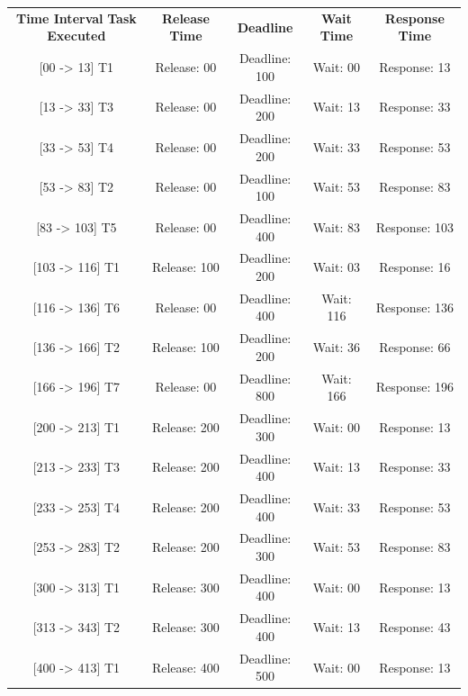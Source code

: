 \documentclass{report}
\begin{document}
\begin{table}[H]
    \centering
    \begin{tabular}{| c | c | c | c | c |}
        \hline
         \textbf{Time Interval} \textbf{Task Executed} & \textbf{Release Time} & \textbf{Deadline} & \textbf{Wait Time} & \textbf{Response Time} \\
        {[00 -> 13]} T1 & Release: 00 & Deadline: 100 & Wait: 00 & Response: 13 \\
        \hline
        {[13 -> 33]} T3 & Release: 00 & Deadline: 200 & Wait: 13 & Response: 33 \\
        \hline
        {[33 -> 53]} T4 & Release: 00 & Deadline: 200 & Wait: 33 & Response: 53 \\
        \hline
        {[53 -> 83]} T2 & Release: 00 & Deadline: 100 & Wait: 53 & Response: 83 \\
        \hline
        {[83 -> 103]} T5 & Release: 00 & Deadline: 400 & Wait: 83 & Response: 103 \\
        \hline
        {[103 -> 116]} T1 & Release: 100 & Deadline: 200 & Wait: 03 & Response: 16 \\
        \hline
        {[116 -> 136]} T6 & Release: 00 & Deadline: 400 & Wait: 116 & Response: 136 \\
        \hline
        {[136 -> 166]} T2 & Release: 100 & Deadline: 200 & Wait: 36 & Response: 66 \\
        \hline
        {[166 -> 196]} T7 & Release: 00 & Deadline: 800 & Wait: 166 & Response: 196 \\
        \hline
        {[200 -> 213]} T1 & Release: 200 & Deadline: 300 & Wait: 00 & Response: 13 \\
        \hline
        {[213 -> 233]} T3 & Release: 200 & Deadline: 400 & Wait: 13 & Response: 33 \\
        \hline
        {[233 -> 253]} T4 & Release: 200 & Deadline: 400 & Wait: 33 & Response: 53 \\
        \hline
        {[253 -> 283]} T2 & Release: 200 & Deadline: 300 & Wait: 53 & Response: 83 \\
        \hline
        {[300 -> 313]} T1 & Release: 300 & Deadline: 400 & Wait: 00 & Response: 13 \\
        \hline
        {[313 -> 343]} T2 & Release: 300 & Deadline: 400 & Wait: 13 & Response: 43 \\
        \hline
        {[400 -> 413]} T1 & Release: 400 & Deadline: 500 & Wait: 00 & Response: 13 \\

\end{tabular}
\end{table}
\end{document}
